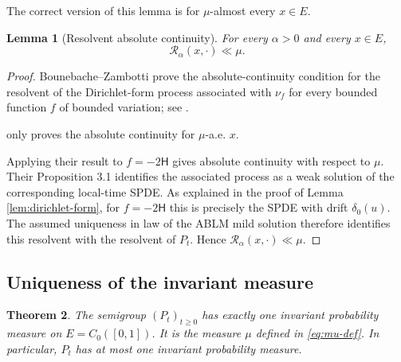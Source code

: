 \documentclass[12pt]{article}
\numberwithin{equation}{section}
\newtheorem{theorem}{Theorem}[section]
\newtheorem{lemma}[theorem]{Lemma}
\newcommand{\1}{\mathbf 1}
\newcommand{\review}[1]{\begin{reviewbox}#1\end{reviewbox}}
\begin{document}
\review{The correct version of this lemma is for $\mu$-almost every $x\in E$.}
\begin{lemma}[Resolvent absolute continuity]\label{lem:resolvent-ac}
For every $\alpha>0$ and every $x\in E$,
\[
        \mathcal R_\alpha(x,\cdot)\ll \mu.
\]
\end{lemma}

\begin{proof}
Bounebache--Zambotti prove the absolute-continuity condition for the resolvent of
the Dirichlet-form process associated with $\nu_f$ for every bounded function
$f$ of bounded variation; see \cite[Proposition 2.5]{BZ14}.\review{[BZ14] only proves the absolute continuity for $\mu$-a.e. $x$.} Applying their result
to $f=-2\mathsf H$ gives absolute continuity with respect to $\mu$. Their
Proposition 3.1 identifies the associated process as a weak solution of the
corresponding local-time SPDE. As explained in the proof of Lemma
\ref{lem:dirichlet-form}, for $f=-2\mathsf H$ this is precisely the SPDE with drift
$\delta_0(u)$. The assumed uniqueness in law of the ABLM mild solution therefore
identifies this resolvent with the resolvent of $P_t$. Hence
$\mathcal R_\alpha(x,\cdot)\ll\mu$.
\end{proof}

\subsection{Uniqueness of the invariant measure}

\begin{theorem}\label{thm:unique-invariant}
The semigroup $(P_t)_{t\geq0}$ has exactly one invariant probability measure on
$E=C_0([0,1])$. It is the measure $\mu$ defined in \eqref{eq:mu-def}. In particular,
$P_t$ has at most one invariant probability measure.
\end{theorem}
\end{document}

